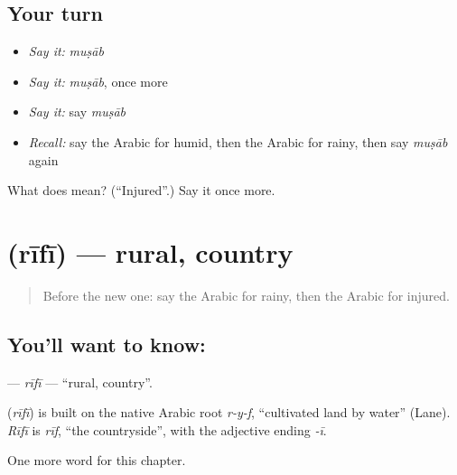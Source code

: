 \subsection*{Your turn}
\begin{itemize}
\raggedright
  \item \emph{Say it:} \emph{muṣāb}
  \item \emph{Say it:} \emph{muṣāb}, once more
  \item \emph{Say it:} say \emph{muṣāb}
  \item \emph{Recall:} say the Arabic for humid, then the Arabic for rainy, then say \emph{muṣāb} again
\end{itemize}

\begin{tcolorbox}[breakable,colback=teal!4,colframe=teal!35!black,title={Before you move on}]
What does  mean? (\textquotedblleft{}Injured\textquotedblright{}.) Say it once more.
\end{tcolorbox}
\section[\texorpdfstring{\ar{ريفي} (rīfī)}{ريفي (rīfī)}]{ (rīfī) — rural, country}

\label{lesson:AR-C180-rifi}



\begin{quote}
Before the new one: say the Arabic for rainy, then the Arabic for injured.
\end{quote}

\subsection*{You'll want to know: }
\textbf{} — \emph{rīfī} — \textquotedblleft{}rural, country\textquotedblright{}.

\begin{cousinweb}
\textbf{} (\emph{rīfī}) is built on the native Arabic root \emph{r-y-f}, \textquotedblleft{}cultivated land by water\textquotedblright{} (Lane). \emph{Rīfī} is \emph{rīf}, \textquotedblleft{}the countryside\textquotedblright{}, with the adjective ending \emph{-ī}.
\end{cousinweb}

\begin{grammarlens}[title={What you've built}]
One more word for this chapter.
\end{grammarlens}

